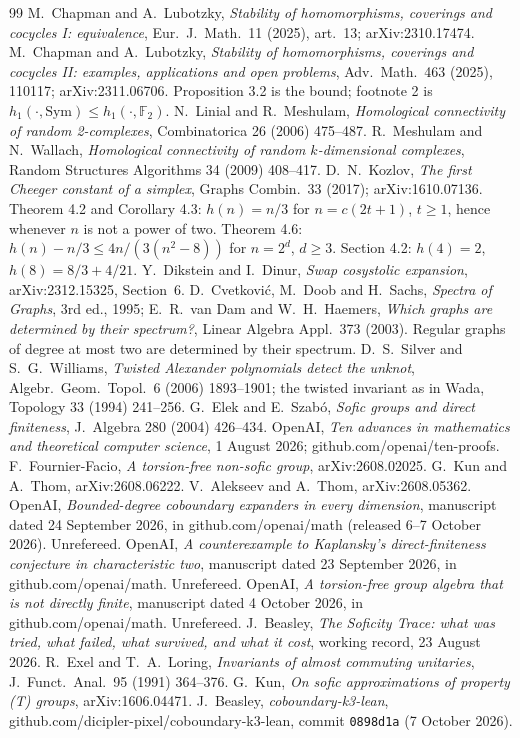 \documentclass[11pt]{article}
\theoremstyle{remark}\newtheorem{remark}[theorem]{Remark}
\newcommand{\Sym}{\mathrm{Sym}}\newcommand{\dH}{d_H}\newcommand{\F}{\mathbb{F}}\newcommand{\Z}{\mathbb{Z}}
\begin{document}
\renewcommand{\refname}{Sources}
\begin{thebibliography}{99}\small
{} M.~Chapman and A.~Lubotzky, \emph{Stability of homomorphisms, coverings and cocycles I: equivalence}, Eur.\ J.\ Math.\ 11 (2025), art.\ 13; arXiv:2310.17474.
 M.~Chapman and A.~Lubotzky, \emph{Stability of homomorphisms, coverings and cocycles II: examples, applications and open problems}, Adv.\ Math.\ 463 (2025), 110117; arXiv:2311.06706. Proposition 3.2 is the bound; footnote 2 is $h_1(\cdot,\Sym)\le h_1(\cdot,\F_2)$.
 N.~Linial and R.~Meshulam, \emph{Homological connectivity of random 2-complexes}, Combinatorica 26 (2006) 475--487.
 R.~Meshulam and N.~Wallach, \emph{Homological connectivity of random $k$-dimensional complexes}, Random Structures Algorithms 34 (2009) 408--417.
 D.~N.~Kozlov, \emph{The first Cheeger constant of a simplex}, Graphs Combin.\ 33 (2017); arXiv:1610.07136. Theorem 4.2 and Corollary 4.3: $h(n)=n/3$ for $n=c(2t+1)$, $t\ge1$, hence whenever $n$ is not a power of two. Theorem 4.6: $h(n)-n/3\le 4n/(3(n^2-8))$ for $n=2^d$, $d\ge3$. Section 4.2: $h(4)=2$, $h(8)=8/3+4/21$.
 Y.~Dikstein and I.~Dinur, \emph{Swap cosystolic expansion}, arXiv:2312.15325, Section~6.
 D.~Cvetkovi\'{c}, M.~Doob and H.~Sachs, \emph{Spectra of Graphs}, 3rd ed., 1995; E.~R.~van Dam and W.~H.~Haemers, \emph{Which graphs are determined by their spectrum?}, Linear Algebra Appl.\ 373 (2003). Regular graphs of degree at most two are determined by their spectrum.
 D.~S.~Silver and S.~G.~Williams, \emph{Twisted Alexander polynomials detect the unknot}, Algebr.\ Geom.\ Topol.\ 6 (2006) 1893--1901; the twisted invariant as in Wada, Topology 33 (1994) 241--256.
 G.~Elek and E.~Szab\'o, \emph{Sofic groups and direct finiteness}, J.\ Algebra 280 (2004) 426--434.
 OpenAI, \emph{Ten advances in mathematics and theoretical computer science}, 1 August 2026; github.com/openai/ten-proofs.
 F.~Fournier-Facio, \emph{A torsion-free non-sofic group}, arXiv:2608.02025.
 G.~Kun and A.~Thom, arXiv:2608.06222.
 V.~Alekseev and A.~Thom, arXiv:2608.05362.
 OpenAI, \emph{Bounded-degree coboundary expanders in every dimension}, manuscript dated 24 September 2026, in github.com/openai/math (released 6--7 October 2026). Unrefereed.
 OpenAI, \emph{A counterexample to Kaplansky's direct-finiteness conjecture in characteristic two}, manuscript dated 23 September 2026, in github.com/openai/math. Unrefereed.
 OpenAI, \emph{A torsion-free group algebra that is not directly finite}, manuscript dated 4 October 2026, in github.com/openai/math. Unrefereed.
 J.~Beasley, \emph{The Soficity Trace: what was tried, what failed, what survived, and what it cost}, working record, 23 August 2026.
 R.~Exel and T.~A.~Loring, \emph{Invariants of almost commuting unitaries}, J.\ Funct.\ Anal.\ 95 (1991) 364--376.
 G.~Kun, \emph{On sofic approximations of property (T) groups}, arXiv:1606.04471.
 J.~Beasley, \emph{coboundary-k3-lean}, github.com/dicipler-pixel/coboundary-k3-lean, commit \texttt{0898d1a} (7 October 2026).
\end{thebibliography}
\end{document}
